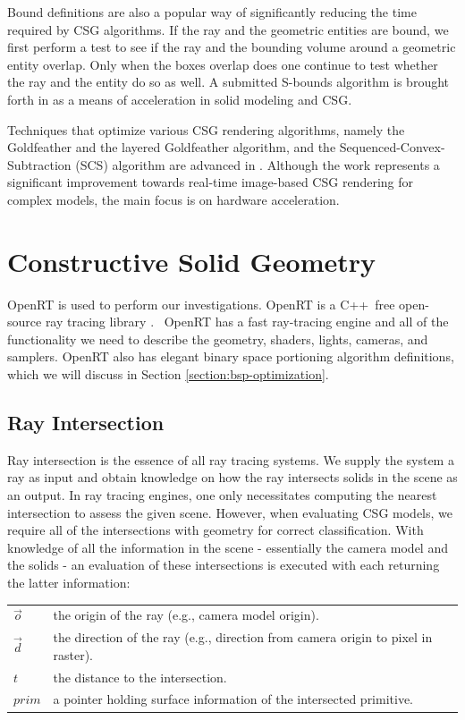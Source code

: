 \documentclass[a4paper,11pt,oneside]{article}
\makeatletter
\newenvironment{conditions}
  {\par\vspace{\abovedisplayskip}\noindent\begin{tabular}{>{$}l<{$} @{${}={}$} l}}
  {\end{tabular}\par\vspace{\belowdisplayskip}}
\makeatother
\begin{document}
Bound definitions are also a popular way of significantly reducing the time required by CSG algorithms. If the ray and the geometric entities are bound, we first perform a test to see if the ray and the bounding volume around a geometric entity overlap. Only when the boxes overlap does one continue to test whether the ray and the entity do so as well. A submitted S-bounds algorithm is brought forth in \cite{sbounds_csg} as a means of acceleration in solid modeling and CSG.
  
Techniques that optimize various CSG rendering algorithms, namely the Goldfeather and the layered Goldfeather algorithm, and the Sequenced-Convex- Subtraction (SCS) algorithm are advanced in \cite{hardware_accelerated_image_based_csg.}. Although the work represents a significant improvement towards real-time image-based CSG rendering for complex models,  the main focus is on hardware acceleration.

  

\section{Constructive Solid Geometry}
    
OpenRT is used to perform our investigations. OpenRT is a C++ free open-source ray tracing library \cite{openrt}.  OpenRT has a fast ray-tracing engine and all of the functionality we need to describe the geometry, shaders, lights, cameras, and samplers. OpenRT also has elegant binary space portioning algorithm definitions, which we will discuss in Section \ref{section:bsp-optimization}.
    
\subsection{Ray Intersection}
\label{section:ray-intersection}

Ray intersection is the essence of all ray tracing systems. We supply the system a ray as input and obtain knowledge on how the ray intersects solids in the scene as an output. In ray tracing engines, one only necessitates computing the nearest intersection to assess the given scene. However, when evaluating CSG models, we require all of the intersections with geometry for correct classification. With knowledge of all the information in the scene - essentially the camera model and the solids - an evaluation of these intersections is executed with each returning the latter information:

\begin{conditions}
	\vec{o}     & the origin of the ray (e.g., camera model origin). \\
	\vec{d}     & the direction of the ray (e.g., direction from camera origin to pixel in raster). \\
	t     &  the distance to the intersection. \\
	prim    &  a pointer holding surface information of the intersected primitive. 
\end{conditions}
\end{document}
